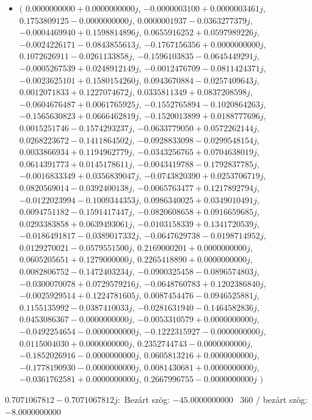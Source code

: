 \documentclass[14pt,a4paper]{article}
\begin{document}
\begin{itemize}
\item
$\big($
$0.0000000000+0.0000000000j$, $-0.0000003100+0.0000003461j$, $0.1753809125-0.0000000000j$, $0.0000001937-0.0363277379j$, $-0.0004469940+0.1598814896j$, $0.0655916252+0.0597989226j$, $-0.0024226171-0.0843855613j$, $-0.1767156356+0.0000000000j$, $0.1072626911-0.0261133858j$, $-0.1596103835-0.0645449291j$, $-0.0005267539+0.0248912149j$, $-0.0012476709-0.0811424371j$, $-0.0023625101+0.1580154260j$, $0.0943670884-0.0257409643j$, $0.0012071833+0.1227074672j$, $0.0335811349+0.0837208598j$, $-0.0604676487+0.0061765925j$, $-0.1552765894-0.1020864263j$, $-0.1565630823+0.0666462819j$, $-0.1520013899+0.0188777696j$, $0.0015251746-0.1574293237j$, $-0.0633779050+0.0572262144j$, $0.0268223672-0.1411864502j$, $-0.0928833098-0.0299548154j$, $0.0033866934+0.1194962779j$, $-0.0343256765+0.0704638019j$, $0.0614391773+0.0145178611j$, $-0.0043419788-0.1792837785j$, $-0.0016833349+0.0356839047j$, $-0.0743820390+0.0253706719j$, $0.0820569014-0.0392400138j$, $-0.0065763477+0.1217892794j$, $-0.0122023994-0.1009344353j$, $0.0986340025+0.0349010491j$, $0.0094751182-0.1591417447j$, $-0.0820608658+0.0916659685j$, $0.0293383858+0.0639493061j$, $-0.0103158339+0.1341720539j$, $-0.0186491817-0.0389017332j$, $-0.0647629738-0.0198714952j$, $0.0129270021-0.0579551500j$, $0.2169000201+0.0000000000j$, $0.0605205651+0.1279000000j$, $0.2265418890+0.0000000000j$, $0.0082806752-0.1472403234j$, $-0.0900325458-0.0896574803j$, $-0.0300070078+0.0729579216j$, $-0.0648760783+0.1202386840j$, $-0.0025929514+0.1224781605j$, $0.0087454476-0.0946525881j$, $0.1155135992-0.0387410033j$, $-0.0281631940-0.1464582836j$, $0.0453086367-0.0000000000j$, $-0.0053310579+0.0000000000j$, $-0.0492254654-0.0000000000j$, $-0.1222315927-0.0000000000j$, $0.0115004030+0.0000000000j$, $0.2352744743-0.0000000000j$, $-0.1852026916-0.0000000000j$, $0.0605813216+0.0000000000j$, $-0.1778190930-0.0000000000j$, $0.0081430681+0.0000000000j$, $-0.0361762581+0.0000000000j$, $0.2667996755-0.0000000000j$
$\big)$
\end{itemize}
$0.7071067812-0.7071067812j$:\
Bezárt szög: $-45.0000000000$ \
360 / bezárt szög: $-8.0000000000$\
\end{document}
